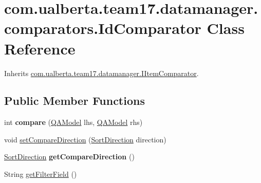 \hypertarget{classcom_1_1ualberta_1_1team17_1_1datamanager_1_1comparators_1_1_id_comparator}{\section{com.\+ualberta.\+team17.\+datamanager.\+comparators.\+Id\+Comparator Class Reference}
\label{classcom_1_1ualberta_1_1team17_1_1datamanager_1_1comparators_1_1_id_comparator}
}


Inherits \hyperlink{interfacecom_1_1ualberta_1_1team17_1_1datamanager_1_1_i_item_comparator}{com.\+ualberta.\+team17.\+datamanager.\+I\+Item\+Comparator}.

\subsection*{Public Member Functions}
\begin{DoxyCompactItemize}
\item 
\hypertarget{classcom_1_1ualberta_1_1team17_1_1datamanager_1_1comparators_1_1_id_comparator_abcda51886e94cf68b17d1fbffbcff109}{int {\bfseries compare} (\hyperlink{classcom_1_1ualberta_1_1team17_1_1_q_a_model}{Q\+A\+Model} lhs, \hyperlink{classcom_1_1ualberta_1_1team17_1_1_q_a_model}{Q\+A\+Model} rhs)}\label{classcom_1_1ualberta_1_1team17_1_1datamanager_1_1comparators_1_1_id_comparator_abcda51886e94cf68b17d1fbffbcff109}

\item 
void \hyperlink{classcom_1_1ualberta_1_1team17_1_1datamanager_1_1comparators_1_1_id_comparator_a8d5e6fbea7247298bf756e54a9d5b6ec}{set\+Compare\+Direction} (\hyperlink{enumcom_1_1ualberta_1_1team17_1_1datamanager_1_1_i_item_comparator_1_1_sort_direction}{Sort\+Direction} direction)
\item 
\hypertarget{classcom_1_1ualberta_1_1team17_1_1datamanager_1_1comparators_1_1_id_comparator_a212315f582f153e841d6cca7e18bab44}{\hyperlink{enumcom_1_1ualberta_1_1team17_1_1datamanager_1_1_i_item_comparator_1_1_sort_direction}{Sort\+Direction} {\bfseries get\+Compare\+Direction} ()}\label{classcom_1_1ualberta_1_1team17_1_1datamanager_1_1comparators_1_1_id_comparator_a212315f582f153e841d6cca7e18bab44}

\item 
String \hyperlink{classcom_1_1ualberta_1_1team17_1_1datamanager_1_1comparators_1_1_id_comparator_aa5e692f8250f50126f90398b9a44eea9}{get\+Filter\+Field} ()
\end{DoxyCompactItemize}


